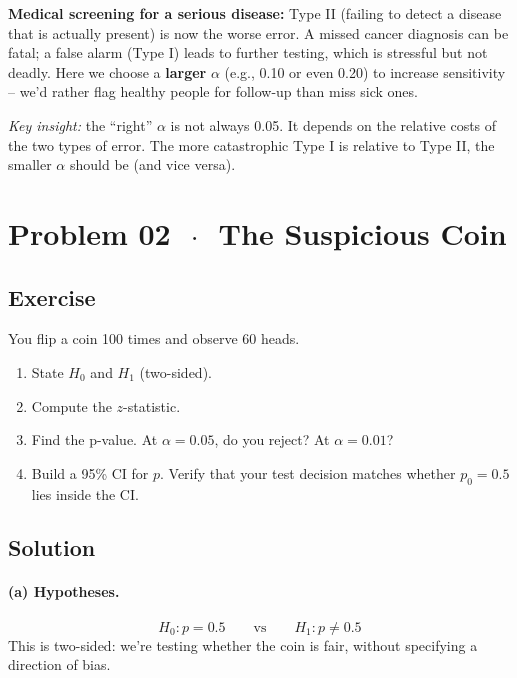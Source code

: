 \documentclass[11pt]{article}
\begin{document}
\textbf{Medical screening for a serious disease:} Type II (failing to detect a disease that is actually present) is now the worse error. A missed cancer diagnosis can be fatal; a false alarm (Type I) leads to further testing, which is stressful but not deadly. Here we choose a \textbf{larger} $\alpha$ (e.g., 0.10 or even 0.20) to increase sensitivity -- we'd rather flag healthy people for follow-up than miss sick ones.

\textit{Key insight:} the ``right'' $\alpha$ is not always 0.05. It depends on the relative costs of the two types of error. The more catastrophic Type I is relative to Type II, the smaller $\alpha$ should be (and vice versa).

\section*{Problem 02 \texorpdfstring{$\,\cdot\,$}{-} The Suspicious Coin}

\subsection*{Exercise}

You flip a coin 100 times and observe 60 heads.

\begin{enumerate}[label=\alph*)]
  \item State $H_0$ and $H_1$ (two-sided).
  \item Compute the $z$-statistic.
  \item Find the p-value. At $\alpha = 0.05$, do you reject? At $\alpha = 0.01$?
  \item Build a 95\% CI for $p$. Verify that your test decision matches whether $p_0 = 0.5$ lies inside the CI.
\end{enumerate}

\subsection*{Solution}

\paragraph{(a) Hypotheses.}

\[
  H_0\colon p = 0.5 \qquad \text{vs} \qquad H_1\colon p \neq 0.5
\]
This is two-sided: we're testing whether the coin is fair, without specifying a direction of bias.
\end{document}

